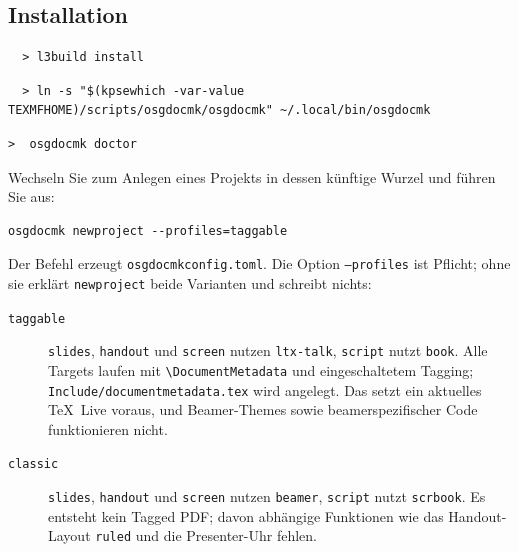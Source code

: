 \documentclass[
load-preamble+
]{osgdoc}
\begin{document}
\subsection{Installation}
\begin{verbatim}
  > l3build install
\end{verbatim}
\begin{verbatim}
  > ln -s "$(kpsewhich -var-value TEXMFHOME)/scripts/osgdocmk/osgdocmk" ~/.local/bin/osgdocmk
\end{verbatim}

\begin{verbatim}
>  osgdocmk doctor
\end{verbatim}


Wechseln Sie zum Anlegen eines Projekts in dessen künftige Wurzel und führen
Sie aus:

\begin{verbatim}
osgdocmk newproject --profiles=taggable
\end{verbatim}

Der Befehl erzeugt \texttt{osgdocmkconfig.toml}. Die Option \texttt{--profiles}
ist Pflicht; ohne sie erklärt \texttt{newproject} beide Varianten und schreibt
nichts:

\begin{description}
\item[\texttt{taggable}] \texttt{slides}, \texttt{handout} und
  \texttt{screen} nutzen \texttt{ltx-talk}, \texttt{script} nutzt
  \texttt{book}. Alle Targets laufen mit \verb|\DocumentMetadata| und
  eingeschaltetem Tagging; \texttt{Include/documentmetadata.tex} wird
  angelegt. Das setzt ein aktuelles \TeX\ Live voraus, und Beamer-Themes
  sowie beamerspezifischer Code funktionieren nicht.
\item[\texttt{classic}] \texttt{slides}, \texttt{handout} und
  \texttt{screen} nutzen \texttt{beamer}, \texttt{script} nutzt
  \texttt{scrbook}. Es entsteht kein Tagged PDF; davon abhängige Funktionen
  wie das Handout-Layout \texttt{ruled} und die Presenter-Uhr fehlen.
\end{description}
\end{document}
